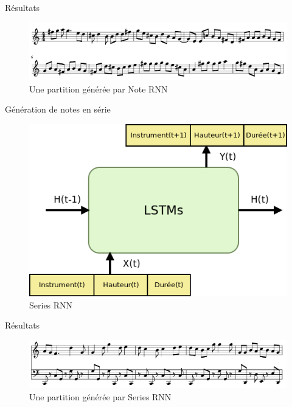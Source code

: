 \documentclass{beamer}
\begin{document}
\begin{frame}{Résultats}
\begin{figure}
\begin{center}
\includegraphics[scale=0.3]{images/note_rnn_result.png}
\caption{Une partition générée par Note RNN}
\end{center}
\end{figure}
\end{frame}

\begin{frame}{Génération de notes en série}
\begin{figure}
\begin{center}
\includegraphics[scale=0.5]{images/series_rnn.png}
\caption{Series RNN}
\end{center}
\end{figure}
\end{frame}

\begin{frame}{Résultats}
\begin{figure}
\begin{center}
\includegraphics[scale=0.3]{images/series_rnn_result.png}
\caption{Une partition générée par Series RNN}
\end{center}
\end{figure}
\end{frame}
\end{document}
